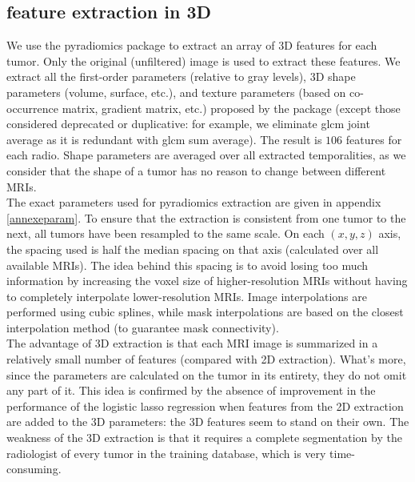 \documentclass[preprint,12pt]{elsarticle}
\begin{document}
\subsection{feature extraction in 3D}
\label{sec:3D}

\noindent We use the pyradiomics package \cite{pyradio} to extract an array of 3D features for each tumor. Only the original (unfiltered) image is used to extract these features. We extract all the first-order parameters (relative to gray levels), 3D shape parameters (volume, surface, etc.), and texture parameters (based on co-occurrence matrix, gradient matrix, etc.) proposed by the package (except those considered deprecated or duplicative: for example, we eliminate glcm joint average as it is redundant with glcm sum average). The result is $106$ features for each radio. Shape parameters are averaged over all extracted temporalities, as we consider that the shape of a tumor has no reason to change between different MRIs.\\
\indent The exact parameters used for pyradiomics extraction are given in appendix \ref{annexeparam}. To ensure that the extraction is consistent from one tumor to the next, all tumors have been resampled to the same scale. On each $(x,y,z)$ axis, the spacing used is half the median spacing on that axis (calculated over all available MRIs). The idea behind this spacing is to avoid losing too much information by increasing the voxel size of higher-resolution MRIs without having to completely interpolate lower-resolution MRIs. Image interpolations are performed using cubic splines, while mask interpolations are based on the closest interpolation method (to guarantee mask connectivity).\\
\indent The advantage of 3D extraction is that each MRI image is summarized in a relatively small number of features (compared with 2D extraction). What's more, since the parameters are calculated on the tumor in its entirety, they do not omit any part of it. This idea is confirmed by the absence of improvement in the performance of the logistic lasso regression when features from the 2D extraction are added to the 3D parameters: the 3D features seem to stand on their own. The weakness of the 3D extraction is that it requires a complete segmentation by the radiologist of every tumor in the training database, which is very time-consuming.
\end{document}
